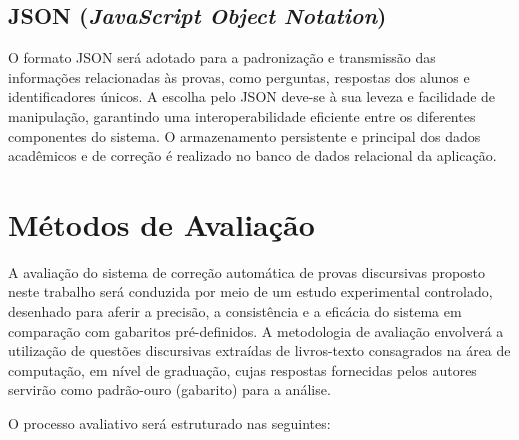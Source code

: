 \subsection{JSON (\textit{JavaScript Object Notation})}
O formato JSON será adotado para a padronização e transmissão das informações relacionadas às provas, como perguntas, respostas dos alunos e identificadores únicos. A escolha pelo JSON deve-se à sua leveza e facilidade de manipulação, garantindo uma interoperabilidade eficiente entre os diferentes componentes do sistema. O armazenamento persistente e principal dos dados acadêmicos e de correção é realizado no banco de dados relacional da aplicação.

\section{Métodos de Avaliação}

A avaliação do sistema de correção automática de provas discursivas proposto neste trabalho será conduzida por meio de um estudo experimental controlado, desenhado para aferir a precisão, a consistência e a eficácia do sistema em comparação com gabaritos pré-definidos. A metodologia de avaliação envolverá a utilização de questões discursivas extraídas de livros-texto consagrados na área de computação, em nível de graduação, cujas respostas fornecidas pelos autores servirão como padrão-ouro (gabarito) para a análise.

O processo avaliativo será estruturado nas seguintes:

